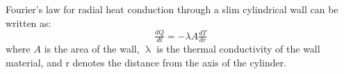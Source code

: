 Fourier’s law for radial heat conduction through a slim cylindrical wall can be
written as:
\begin{equation}
\tfrac{dQ}{dt} = -\lambda A \tfrac{dT}{dr} \tag{6}
\end{equation}
where $A$ is the area of the wall, $\uplambda$ is the thermal conductivity of the
wall material, and r denotes the distance from the axis of the cylinder.

\noindent{}
